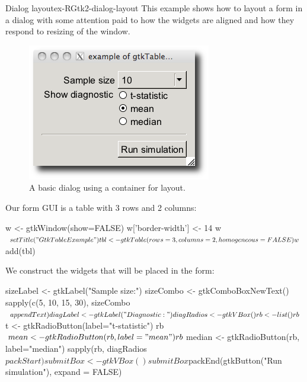 \begin{example}{Dialog layout}{ex-RGtk2-dialog-layout}
This example shows how to layout a form in a dialog with some
attention paid to how the widgets are aligned and how they respond to
resizing of the window.

\begin{figure}
  \centering
  \includegraphics[width=.5\textwidth]{ex-RGtk2-dialog-layout}
  \caption{A basic dialog using a  container for layout.}
  \label{fig:RGtk2-dialog-layout}
\end{figure}


Our form GUI is a table with 3 rows and 2 columns:
\begin{Schunk}
\begin{Sinput}
 w <- gtkWindow(show=FALSE)
 w['border-width'] <- 14
 w$setTitle("GtkTable Example")
 tbl <- gtkTable(rows=3, columns=2, homogeneous=FALSE)
 w$add(tbl)
\end{Sinput}
\end{Schunk}

We construct the widgets that will be placed in the form:
\begin{Schunk}
\begin{Sinput}
 sizeLabel <- gtkLabel("Sample size:")
 sizeCombo <- gtkComboBoxNewText()
 sapply(c(5, 10, 15, 30), sizeCombo$appendText)
 diagLabel <- gtkLabel("Diagnostic:")
 diagRadios <- gtkVBox()
 rb <- list()
 rb$t <- gtkRadioButton(label="t-statistic")
 rb$mean <- gtkRadioButton(rb, label="mean")
 rb$median <- gtkRadioButton(rb, label="median")
 sapply(rb, diagRadios$packStart)
 submitBox <- gtkVBox()
 submitBox$packEnd(gtkButton("Run simulation"), expand = FALSE)
\end{Sinput}
\end{Schunk}


\end{example}
